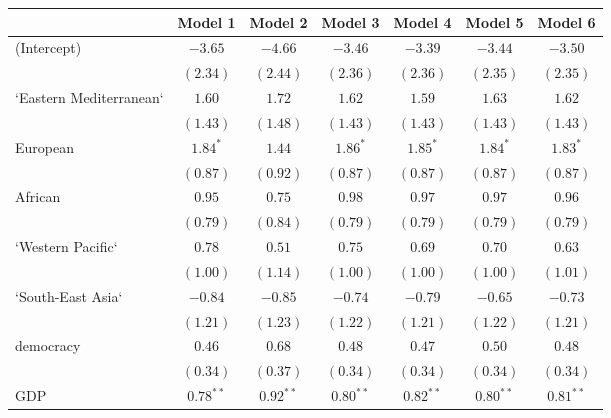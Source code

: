 
\begin{table}[!h]
\begin{center}
\begin{tabular}{l c c c c c c }
\toprule
 & Model 1 & Model 2 & Model 3 & Model 4 & Model 5 & Model 6 \\
\midrule
(Intercept)             & $-3.65$      & $-4.66$      & $-3.46$      & $-3.39$      & $-3.44$      & $-3.50$      \\
                        & $(2.34)$     & $(2.44)$     & $(2.36)$     & $(2.36)$     & $(2.35)$     & $(2.35)$     \\
`Eastern Mediterranean` & $1.60$       & $1.72$       & $1.62$       & $1.59$       & $1.63$       & $1.62$       \\
                        & $(1.43)$     & $(1.48)$     & $(1.43)$     & $(1.43)$     & $(1.43)$     & $(1.43)$     \\
European                & $1.84^{*}$   & $1.44$       & $1.86^{*}$   & $1.85^{*}$   & $1.84^{*}$   & $1.83^{*}$   \\
                        & $(0.87)$     & $(0.92)$     & $(0.87)$     & $(0.87)$     & $(0.87)$     & $(0.87)$     \\
African                 & $0.95$       & $0.75$       & $0.98$       & $0.97$       & $0.97$       & $0.96$       \\
                        & $(0.79)$     & $(0.84)$     & $(0.79)$     & $(0.79)$     & $(0.79)$     & $(0.79)$     \\
`Western Pacific`       & $0.78$       & $0.51$       & $0.75$       & $0.69$       & $0.70$       & $0.63$       \\
                        & $(1.00)$     & $(1.14)$     & $(1.00)$     & $(1.00)$     & $(1.00)$     & $(1.01)$     \\
`South-East Asia`       & $-0.84$      & $-0.85$      & $-0.74$      & $-0.79$      & $-0.65$      & $-0.73$      \\
                        & $(1.21)$     & $(1.23)$     & $(1.22)$     & $(1.21)$     & $(1.22)$     & $(1.21)$     \\
democracy               & $0.46$       & $0.68$       & $0.48$       & $0.47$       & $0.50$       & $0.48$       \\
                        & $(0.34)$     & $(0.37)$     & $(0.34)$     & $(0.34)$     & $(0.34)$     & $(0.34)$     \\
GDP                     & $0.78^{**}$  & $0.92^{**}$  & $0.80^{**}$  & $0.82^{**}$  & $0.80^{**}$  & $0.81^{**}$  \\

\end{tabular}
\end{center}
\end{table}
